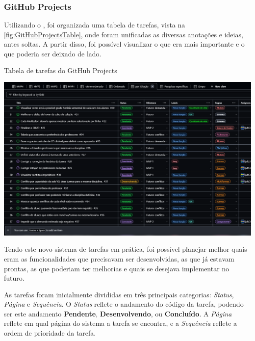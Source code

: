 \subsubsection*{GitHub Projects} \label{sssec:GitHub Projects}

Utilizando o , foi organizada uma tabela de tarefas, vista na \autoref{fig:GitHubProjectsTable}, onde foram unificadas as diversas anotações e ideias, antes soltas. A partir disso, foi possível visualizar o que era mais importante e o que poderia ser deixado de lado.

\begin{MyCenteredFigure} \caption{Tabela de tarefas do GitHub Projects} \label{fig:GitHubProjectsTable}
  \includegraphics[width=\textwidth]{files/img/2.02!5-desenvolvimento/2.02!5.1.4-sistema/GitHub Projects/GitHubProjects-Table}
\end{MyCenteredFigure}

Tendo este novo sistema de tarefas em prática, foi possível planejar melhor quais eram as funcionalidades que precisavam ser desenvolvidas, as que já estavam prontas, as que poderiam ter melhorias e quais se desejava implementar no futuro.

As tarefas foram inicialmente divididas em três principais categorias: \textit{Status}, \textit{Página} e \textit{Sequência}. O \textit{Status} reflete o andamento do código da tarefa, podendo ser este andamento \textbf{Pendente}, \textbf{Desenvolvendo}, ou \textbf{Concluído}. A \textit{Página} reflete em qual página do sistema a tarefa se encontra, e a \textit{Sequência} reflete a ordem de prioridade da tarefa.

